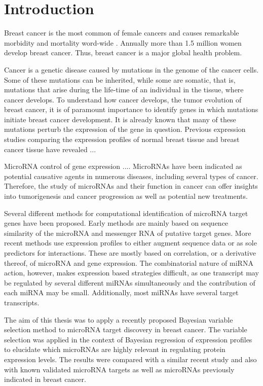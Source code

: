 
\section{Introduction}
\thispagestyle{empty}

Breast cancer is the most common of female cancers and causes remarkable
morbidity and mortality word-wide \citep{??}.  Annually more than 1.5 million
women develop breast cancer. Thus, breast cancer is a major global health
problem.

Cancer is a genetic disease caused by mutations in the genome of the cancer
cells. Some of these mutations can be inherited, while some are somatic, that
is, mutations that arise during the life-time of an individual in the tissue,
where cancer develops. To understand how cancer develops, the tumor evolution
of breast cancer, it is of paramount importance to identify genes in which
mutations initiate breast cancer development. It is already known that many of
these mutations perturb the expression of the gene in question. Previous
expression studies comparing the expression profiles of normal breast tissue
and breast cancer tissue have revealed ...

MicroRNA control of gene expression .... MicroRNAs have been indicated as
potential causative agents in numerous diseases, including several types of
cancer. Therefore, the study of microRNAs and their function in cancer can
offer insights into tumorigenesis and cancer progression as well as potential
new treatments.

Several different methods for computational identification of microRNA target
genes have been proposed. Early methods are mainly based on sequence similarity of the
microRNA and messenger RNA of putative target genes. More recent methods use
expression profiles to either augment sequence data or as sole predictors for
interactions. These are mostly based on correlation, or a derivative thereof,
of microRNA and gene expression. The combinatorial nature of miRNA action, however,
makes expression based strategies difficult, as one transcript may be regulated
by several different miRNAs simultaneously and the contribution of each
miRNA may be small. Additionally, most miRNAs have several target transcripts.

The aim of this thesis was to apply a recently proposed Bayesian variable
selection method to microRNA target discovery in breast cancer. The variable
selection was applied in the context of Bayesian regression of expression
profiles to elucidate which microRNAs are highly relevant in regulating
protein expression levels. The results were compared with a similar recent
study and also with known validated microRNA targets as well as microRNAs
previously indicated in breast cancer.
